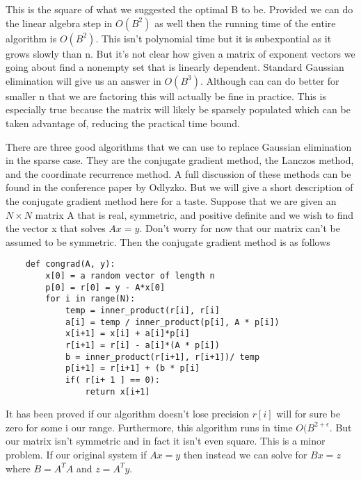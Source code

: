 \documentclass{article}
\begin{document}
This is the square of what we suggested the optimal B to be. Provided we can do the linear algebra step in $O(B^2)$ as well then the running time of the entire algorithm is $O(B^2) $. This isn't polynomial time but it is subexpontial as it grows slowly than n. But it's not clear how given a matrix of exponent vectors we going about find a nonempty set that is linearly dependent. Standard Gaussian elimination will give us an answer in $O(B^3)$. Although can can do better for smaller n that we are factoring this will actually be fine in practice. This is especially true because the matrix will likely be sparsely populated which can be taken advantage of, reducing the practical time bound. 

There are three good algorithms that we can use to replace Gaussian elimination in the sparse case. They are the conjugate gradient method, the Lanczos method, and the coordinate recurrence method. A full discussion of these methods can be found in the conference paper by Odlyzko\cite{discretelog}. But we will give a short description of the conjugate gradient method here for a taste. Suppose that we are given an $N \times N$ matrix A that is real, symmetric, and positive definite and we wish to find the vector x that solves $Ax = y$. Don't worry for now that our matrix can't be assumed to be symmetric. Then the conjugate gradient method is as follows
\begin{verbatim}
    def congrad(A, y):
        x[0] = a random vector of length n
        p[0] = r[0] = y - A*x[0]
        for i in range(N): 
            temp = inner_product(r[i], r[i]
            a[i] = temp / inner_product(p[i], A * p[i])
            x[i+1] = x[i] + a[i]*p[i]
            r[i+1] = r[i] - a[i]*(A * p[i])
            b = inner_product(r[i+1], r[i+1])/ temp
            p[i+1] = r[i+1] + (b * p[i]
            if( r[i+ 1 ] == 0):
                return x[i+1]
\end{verbatim}

It has been proved if our algorithm doesn't lose precision $r[i]$ will for sure be zero for some i our range\cite{hestenes1952methods}. Furthermore, this algorithm runs in time $O(B^{2 + \epsilon}$.   But our matrix isn't symmetric and in fact it isn't even square. This is a minor problem. If our original system if $Ax = y$ then instead we can solve for $B x = z $ where $B = A^T A$ and $z = A^T y$. 
\end{document}
